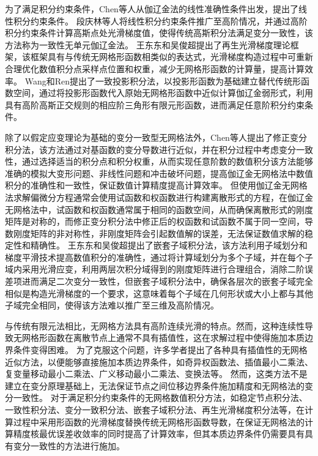 为了满足积分约束条件，Chen等人从伽辽金法的线性准确性条件出发，提出了线性积分约束条件\textsuperscript{\cite{chen2001}}。
段庆林等人\textsuperscript{\cite{陈嵩涛2020几何非线性分析的高效高阶无网格法,duan2012}}将线性积分约束条件推广至高阶情况，并通过高阶积分约束条件计算高斯点处光滑梯度值，使得传统高斯积分法满足变分一致性，该方法称为一致性无单元伽辽金法。
王东东和吴俊超提出了再生光滑梯度理论框架\textsuperscript{\cite{wang2019}}，该框架具有与传统无网格形函数相类似的表达式，光滑梯度构造过程中可重新合理优化数值积分点采样点位置和权重，减少无网格形函数的计算量，提高计算效率。
Wang和Ren\textsuperscript{\cite{wang2023}}提出了一致投影积分法，以投影形函数为基础建立替代传统形函数空间，通过将投影形函数代入原始无网格形函数中近似计算伽辽金弱形式，利用具有高阶高斯正交规则的相应阶三角形有限元形函数，进而满足任意阶积分约束条件。\par
除了以假定应变理论为基础的变分一致型无网格法外，Chen等人\textsuperscript{\cite{chen1996}}提出了修正变分积分法，该方法通过对基函数的变分导数进行近似，并在积分过程中考虑变分一致性，通过选择适当的积分点和积分权重，从而实现任意阶数的数值积分该方法能够准确的模拟大变形问题、非线性问题和冲击破坏问题，提高伽辽金无网格法中数值积分的准确性和一致性，保证数值计算精度提高计算效率。
但使用伽辽金无网格法求解偏微分方程通常会使用试函数和权函数进行构建离散形式的方程，在伽辽金无网格法中，试函数和权函数通常属于相同的函数空间，从而确保离散形式的刚度矩阵是对称的，而修正变分积分法中修正后的权函数和试函数不属于同一空间，导数刚度矩阵的非对称性，非刚度矩阵会引起数值解的误差，无法保证数值求解的稳定性和精确性。
王东东和吴俊超提出了嵌套子域积分法\textsuperscript{\cite{wang2016}}，该方法利用子域划分和梯度平滑技术提高数值积分的准确性，通过将计算域划分为多个子域，并在每个子域内采用光滑应变，利用两层次积分域得到的刚度矩阵进行合理组合，消除二阶误差项进而满足二次变分一致性，但嵌套子域积分法中，确保各层次的嵌套子域完全相似是构造光滑梯度的一个要求，这意味着每个子域在几何形状或大小上都与其他子域完全相同，使得该方法难以推广至三维及高阶情况。
\par
与传统有限元法相比，无网格方法具有高阶连续光滑的特点。然而，这种连续性导致无网格形函数在离散节点上通常不具有插值性，这在求解过程中使得施加本质边界条件变得困难。
为了克服这个问题，许多学者提出了各种具有插值性的无网格近似方法，以便能够直接施加本质边界条件\textsuperscript{\cite{CaoYang2020,fernandez-mendez2004}}，如奇异权函数法\textsuperscript{\cite{kaljevic1997}}、插值最小二乘法\textsuperscript{\cite{liu2019,ChenXinXin2021}}、复变量移动最小二乘法\textsuperscript{\cite{ChengYuMin2005}}、广义移动最小二乘法\textsuperscript{\cite{HuangJuan2007}}、变换法\textsuperscript{\cite{chen2000}}等。
然而，这类方法不是建立在变分原理基础上，无法保证节点之间位移边界条件施加精度和无网格法的变分一致性。
对于满足积分约束条件的无网格数值积分方法，如稳定节点积分法\textsuperscript{\cite{chen2001}}、一致性积分法\textsuperscript{\cite{陈嵩涛2020几何非线性分析的高效高阶无网格法,duan2012}}、变分一致积分法\textsuperscript{\cite{chen2013}}、嵌套子域积分法\textsuperscript{\cite{wang2016}}、再生光滑梯度积分法\textsuperscript{\cite{wang2019}}等，在计算过程中采用形函数的光滑梯度替换传统无网格形函数导数，在保证无网格法的计算精度核最优误差收敛率的同时提高了计算效率，但其本质边界条件仍需要具有具有变分一致性的方法进行施加\textsuperscript{\cite{WuJunChao,hillman2021}}。
